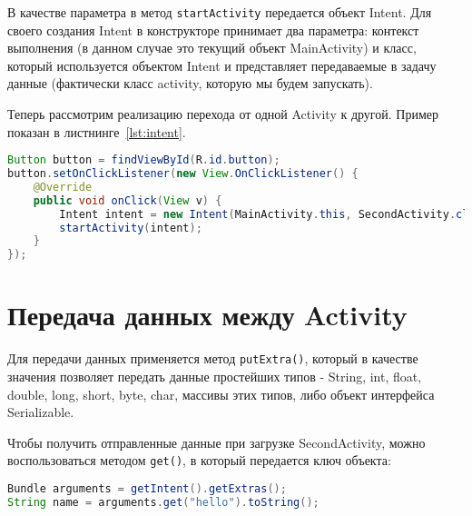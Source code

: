 В качестве параметра в метод \texttt{startActivity} передается объект Intent.
Для своего создания Intent в конструкторе принимает два параметра: контекст
выполнения (в данном случае это текущий объект MainActivity) и класс,
который используется объектом Intent и представляет передаваемые в задачу
данные (фактически класс activity, которую мы будем запускать).\par
Теперь рассмотрим реализацию перехода от одной Activity к другой.
Пример показан в листнинге~\ref{lst:intent}.

\begin{lstlisting}[language=Java
	, caption=\leftline{}
	, label=lst:intent
	]
Button button = findViewById(R.id.button);
button.setOnClickListener(new View.OnClickListener() {
	@Override
	public void onClick(View v) {
		Intent intent = new Intent(MainActivity.this, SecondActivity.class);
		startActivity(intent);
	}
});
\end{lstlisting}

\section{Передача данных между Activity}
Для передачи данных применяется метод \texttt{putExtra()}, который в качестве
значения позволяет передать данные простейших типов - String, int, float,
double, long, short, byte, char, массивы этих типов, либо объект интерфейса
Serializable.\par
Чтобы получить отправленные данные при загрузке SecondActivity, можно
воспользоваться методом \texttt{get()}, в который передается ключ объекта:

\begin{lstlisting}[language=Java
	, caption=\leftline{Получение намеренья}
	]
Bundle arguments = getIntent().getExtras();
String name = arguments.get("hello").toString();
\end{lstlisting}

